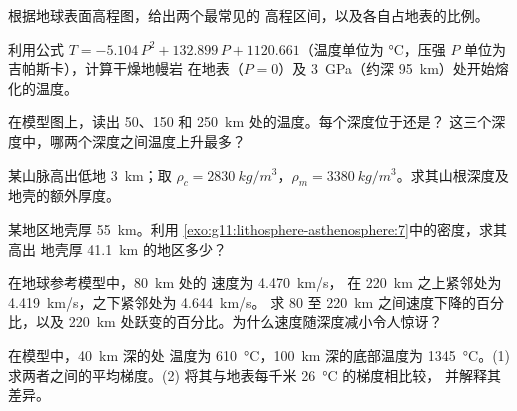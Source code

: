 \begin{exercise}[$\star$]\label{exo:g11:lithosphere-asthenosphere:4}
根据地球表面高程图，给出两个最常见的
高程区间，以及各自占地表的比例。
\end{exercise}

\begin{exercise}[$\star$]\label{exo:g11:lithosphere-asthenosphere:5}
利用公式 $T = -5.104\,P^2 + 132.899\,P + 1120.661$（温度单位为
\unit{\celsius}，压强 $P$ 单位为吉帕斯卡），计算干燥地幔岩
在地表（$P = 0$）及
\qty{3}{GPa}（约深 \qty{95}{km}）处开始熔化的温度。
\end{exercise}

\begin{exercise}[$\star\star$]\label{exo:g11:lithosphere-asthenosphere:6}
在模型图上，读出 50、150 和
\qty{250}{km} 处的温度。每个深度位于还是？
这三个深度中，哪两个深度之间温度上升最多？
\end{exercise}

\begin{exercise}[$\star\star$]\label{exo:g11:lithosphere-asthenosphere:7}
某山脉高出低地 \qty{3}{km}；取 $\rho_c =
\qty{2830}{kg/m^3}$，$\rho_m = \qty{3380}{kg/m^3}$。求其山根深度及
地壳的额外厚度。
\end{exercise}

\begin{exercise}[$\star\star$]\label{exo:g11:lithosphere-asthenosphere:8}
某地区地壳厚 \qty{55}{km}。利用
\cref{exo:g11:lithosphere-asthenosphere:7}中的密度，求其高出
地壳厚 \qty{41.1}{km} 的地区多少？
\end{exercise}

\begin{exercise}[$\star\star$]\label{exo:g11:lithosphere-asthenosphere:9}
在地球参考模型中，\qty{80}{km} 处的 速度为 \qty{4.470}{km/s}，
在 \qty{220}{km} 之上紧邻处为 \qty{4.419}{km/s}，之下紧邻处为 \qty{4.644}{km/s}。
求 80 至 \qty{220}{km} 之间速度下降的百分比，以及
\qty{220}{km} 处跃变的百分比。为什么速度随深度减小令人惊讶？
\end{exercise}

\begin{exercise}[$\star\star$]\label{exo:g11:lithosphere-asthenosphere:10}
在模型中，\qty{40}{km} 深的处
温度为 \qty{610}{\celsius}，\qty{100}{km} 深的底部温度为
\qty{1345}{\celsius}。(1) 求两者之间的平均梯度。(2)
将其与地表每千米 \qty{26}{\celsius} 的梯度相比较，
并解释其差异。
\end{exercise}

